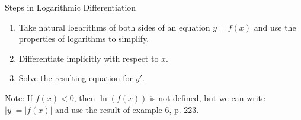\begin{frame}
Steps in Logarithmic Differentiation
\begin{enumerate}
\item  Take natural logarithms of both sides of an equation $y = f(x)$ and use the properties of logarithms to simplify.
\item  Differentiate implicitly with respect to $x$.
\item  Solve the resulting equation for $y'$.
\end{enumerate}
Note: If $f(x) < 0$, then $\ln (f(x))$ is not defined, but we can write $|y| = |f(x)|$ and use the result of example 6, p. 223.
\end{frame}
